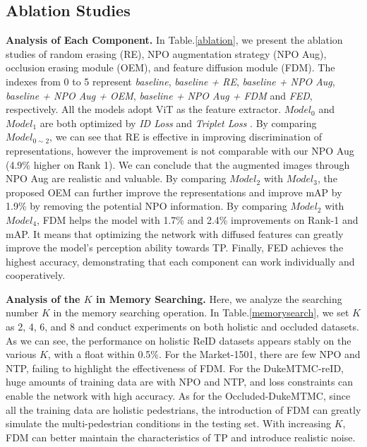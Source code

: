 \documentclass[10pt,twocolumn,letterpaper]{article}
\begin{document}
\subsection{Ablation Studies}
\textbf{Analysis of Each Component.} 
In Table.\ref{ablation}, we present the ablation studies of random erasing (RE), NPO augmentation strategy (NPO Aug), occlusion erasing module (OEM), and feature diffusion module (FDM). The indexes from 0 to 5 represent \emph{baseline}, \emph{baseline + RE}, \emph{baseline + NPO Aug}, \emph{baseline + NPO Aug + OEM}, \emph{baseline + NPO Aug + FDM} and \emph{FED}, respectively. All the models adopt ViT as the feature extractor. $Model_0$ and $Model_1$ are both optimized by \emph{ID Loss} and \emph{Triplet Loss} \cite{hermans2017defense}. By comparing $Model_{0\sim2}$, we can see that RE \cite{zhong2020random} is effective in improving discrimination of representations, however the improvement is not comparable with our NPO Aug (4.9\% higher on Rank 1). We can conclude that the augmented images through NPO Aug are realistic and valuable. By comparing $Model_2$ with $Model_3$, the proposed OEM can further improve the representations and improve mAP by 1.9\% by removing the potential NPO information. By comparing $Model_2$ with $Model_4$, FDM helps the model with 1.7\% and 2.4\% improvements on Rank-1 and mAP. It means that optimizing the network with diffused features can greatly improve the model's perception ability towards TP. Finally, FED achieves the highest accuracy, demonstrating that each component can work individually and cooperatively.





\textbf{Analysis of the $K$ in Memory Searching.}
Here, we analyze the searching number $K$ in the memory searching operation. In Table.\ref{memorysearch}, we set $K$ as 2, 4, 6, and 8 and conduct experiments on both holistic and occluded datasets. As we can see, the performance on holistic ReID datasets appears stably on the various $K$, with a float within 0.5\%. For the Market-1501, there are few NPO and NTP, failing to highlight the effectiveness of FDM. For the DukeMTMC-reID, huge amounts of training data are with NPO and NTP, and loss constraints can enable the network with high accuracy. 
As for the Occluded-DukeMTMC, since all the training data are holistic pedestrians, the introduction of FDM can greatly simulate the multi-pedestrian conditions in the testing set. With increasing $K$, FDM can better maintain the characteristics of TP and introduce realistic noise.  
\end{document}
